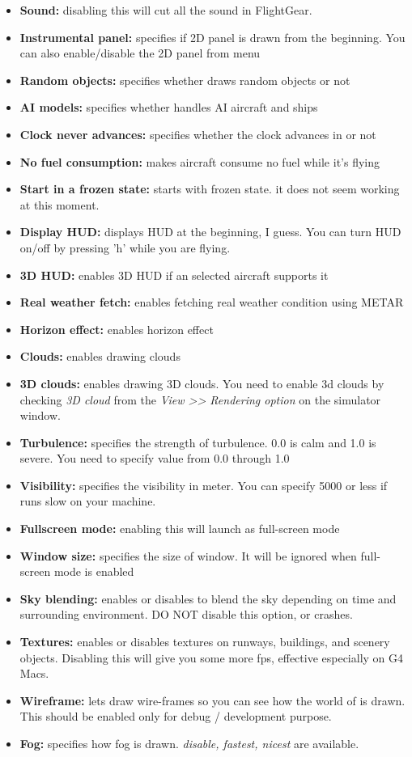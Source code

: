 \begin{itemize}
\item \textbf{Sound:} disabling this will cut all the sound in FlightGear.
\item \textbf{Instrumental panel:} specifies if 2D panel is drawn from the beginning. You can also enable/disable the 2D panel from \FlightGear{} menu
\item \textbf{Random objects:} specifies whether \FlightGear{} draws random objects or not
\item \textbf{AI models:} specifies whether \FlightGear{} handles AI aircraft and ships
\item \textbf{Clock never advances:} specifies whether the clock advances in \FlightGear{} or not
\item \textbf{No fuel consumption:} makes aircraft consume no fuel while it's flying
\item \textbf{Start in a frozen state:} starts \FlightGear{} with frozen state. it does not seem working at this moment.
\item \textbf{Display HUD:} displays HUD at the beginning, I guess. You can turn HUD on/off by pressing 'h' while you are flying.
\item \textbf{3D HUD:} enables 3D HUD if an selected aircraft supports it
\item \textbf{Real weather fetch:} enables fetching real weather condition using METAR
\item \textbf{Horizon effect:} enables horizon effect
\item \textbf{Clouds:} enables drawing clouds
\item \textbf{3D clouds:} enables drawing 3D clouds. You need to enable 3d clouds by checking \textit{3D cloud} from the \textit{View >> Rendering option} on the \FlightGear{} simulator window. 
\item \textbf{Turbulence:} specifies the strength of turbulence. 0.0 is calm and 1.0 is severe. You need to specify value from 0.0 through 1.0
\item \textbf{Visibility:} specifies the visibility in meter. You can specify 5000 or less if \FlightGear{} runs slow on your machine.
\item \textbf{Fullscreen mode:} enabling this will launch \FlightGear{} as full-screen mode
\item \textbf{Window size:} specifies the size of \FlightGear{} window. It will be ignored when full-screen mode is enabled
\item \textbf{Sky blending:} enables or disables \FlightGear{} to blend the sky depending on time and surrounding environment. DO NOT disable this option, or \FlightGear{} crashes.
\item \textbf{Textures:} enables or disables textures on runways, buildings, and scenery objects. Disabling this will give you some more fps, effective especially on G4 Macs.
\item \textbf{Wireframe:} lets \FlightGear{} draw wire-frames so you can see how the world of \FlightGear{} is drawn. This should be enabled only for debug / development purpose.
\item \textbf{Fog:} specifies how fog is drawn. \textit{disable, fastest, nicest} are available.
\end{itemize}

